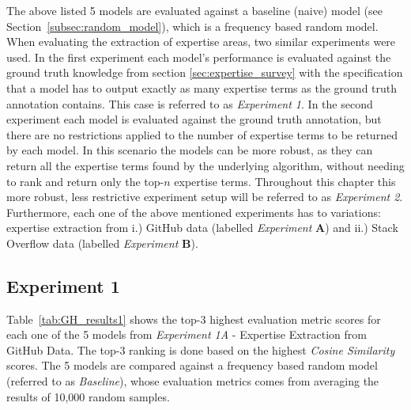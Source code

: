         The above listed 5 models are evaluated against a baseline (naive) model (see Section~\ref{subsec:random_model}), which is a frequency based random model. When evaluating the extraction of expertise areas, two similar experiments were used. In the first experiment each model's performance is evaluated against the ground truth knowledge from section \ref{sec:expertise_survey} with the specification that a model has to output exactly as many expertise terms as the ground truth annotation contains. This case is referred to as \emph{Experiment 1}. In the second experiment each model is evaluated against the ground truth annotation, but there are no restrictions applied to the number of expertise terms to be returned by each model. In this scenario the models can be more robust, as they can return all the expertise terms found by the underlying algorithm, without needing to rank and return only the top-$n$ expertise terms. Throughout this chapter this more robust, less restrictive experiment setup will be referred to as \emph{Experiment 2}. Furthermore, each one of the above mentioned experiments has to variations: expertise extraction from i.) GitHub data (labelled \emph{Experiment} \textbf{A}) and ii.) Stack Overflow data (labelled \emph{Experiment} \textbf{B}).
        
        \subsection{Experiment 1}
        
            Table~\ref{tab:GH_results1} shows the top-$3$ highest evaluation metric scores for each one of the 5 models from \emph{Experiment 1A} - Expertise Extraction from GitHub Data. The top-$3$ ranking is done based on the highest \emph{Cosine Similarity} scores. The 5 models are compared against a frequency based random model (referred to as \emph{Baseline}), whose evaluation metrics comes from averaging the results of 10,000 random samples.
            
